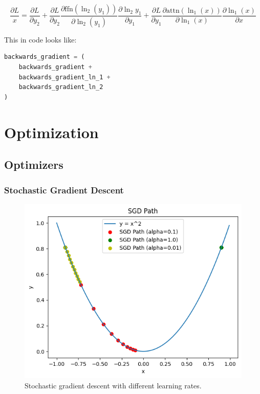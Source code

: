 \documentclass{article}
\begin{document}
$$
\frac{\partial L}{x} = 
\frac{\partial L}{\partial y_2} +
\frac{\partial L}{\partial y_2}
\frac{\partial \text{ffn}(\ln_2(y_1))}{\partial \ln_2(y_1)}
\frac{\partial \ln_2{y_1}}{\partial y_1} +
\frac{\partial L}{\partial y_1}
\frac{\partial \text{attn}(\ln_1(x))}{\partial \ln_1(x)}
\frac{\partial \ln_1(x)}{\partial x}
$$

This in code looks like:

\begin{lstlisting}[language=Python]
backwards_gradient = (
    backwards_gradient +
    backwards_gradient_ln_1 +
    backwards_gradient_ln_2
)
\end{lstlisting}

\section*{Optimization}

\subsection*{Optimizers}
\subsubsection*{Stochastic Gradient Descent}

\begin{figure}[htbp]
    \centering
    \includegraphics[width=\linewidth]{images/sgd.png}
    \caption{Stochastic gradient descent with different learning rates.}
    \label{fig:sgd}
\end{figure}
\end{document}
